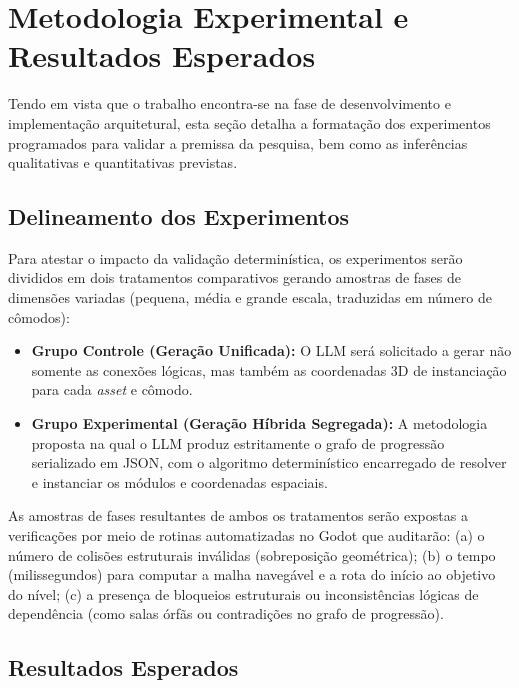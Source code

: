 \section{Metodologia Experimental e Resultados Esperados}

Tendo em vista que o trabalho encontra-se na fase de desenvolvimento e implementação arquitetural, esta seção detalha a formatação dos experimentos programados para validar a premissa da pesquisa, bem como as inferências qualitativas e quantitativas previstas.

\subsection{Delineamento dos Experimentos}

Para atestar o impacto da validação determinística, os experimentos serão divididos em dois tratamentos comparativos gerando amostras de fases de dimensões variadas (pequena, média e grande escala, traduzidas em número de cômodos):

\begin{itemize}[leftmargin=*]
  \item \textbf{Grupo Controle (Geração Unificada):} O LLM será solicitado a gerar não somente as conexões lógicas, mas também as coordenadas 3D de instanciação para cada \textit{asset} e cômodo.
  \item \textbf{Grupo Experimental (Geração Híbrida Segregada):} A metodologia proposta na qual o LLM produz estritamente o grafo de progressão serializado em JSON, com o algoritmo determinístico encarregado de resolver e instanciar os módulos e coordenadas espaciais.
\end{itemize}

As amostras de fases resultantes de ambos os tratamentos serão expostas a verificações por meio de rotinas automatizadas no Godot que auditarão: (a) o número de colisões estruturais inválidas (sobreposição geométrica); (b) o tempo (milissegundos) para computar a malha navegável e a rota do início ao objetivo do nível; (c) a presença de bloqueios estruturais ou inconsistências lógicas de dependência (como salas órfãs ou contradições no grafo de progressão).

\subsection{Resultados Esperados}


